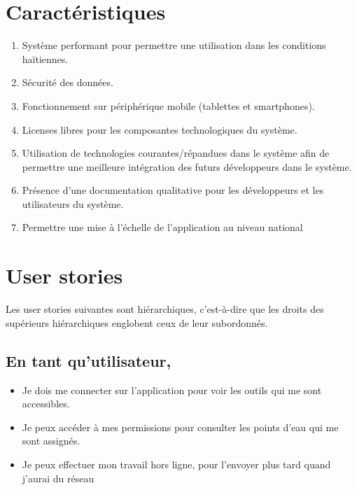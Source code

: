 \documentclass[a4paper, 11pt]{article}
\begin{document}
\section{Caractéristiques}
\begin{enumerate}
  \item Système performant pour permettre une utilisation dans les conditions haïtiennes.
  \item Sécurité des données.
  \item Fonctionnement sur périphérique mobile (tablettes et smartphones).
  \item Licenses libres pour les composantes technologiques du système.
  \item Utilisation de technologies courantes/répandues dans le système afin de permettre une meilleure intégration des futurs développeurs dans le système.
  \item Présence d'une documentation qualitative pour les développeurs et les utilisateurs du système.
  \item Permettre une mise à l'échelle de l'application au niveau national
\end{enumerate}

\section{User stories}
Les user stories suivantes sont hiérarchiques, c'est-à-dire que les droits des supérieurs hiérarchiques englobent ceux de leur subordonnés.
\subsection{En tant qu'utilisateur,}
\begin{itemize}
  \item Je dois me connecter sur l'application pour voir les outils qui me sont accessibles.
  \item Je peux accéder à mes permissions pour consulter les points d'eau qui me sont assignés.
  \item Je peux effectuer mon travail hors ligne, pour l'envoyer plus tard quand j'aurai du réseau %
\end{itemize}
\end{document}
